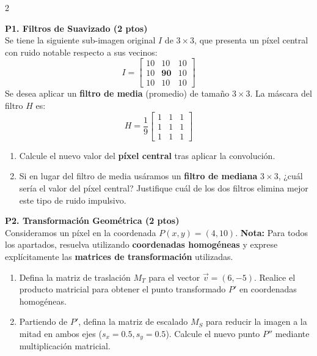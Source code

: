 \documentclass[a4paper,10pt]{extarticle}
\begin{document}
\begin{multicols*}{2}

\textbf{P1. Filtros de Suavizado (2 ptos)}\\
Se tiene la siguiente sub-imagen original $I$ de $3 \times 3$, que presenta un píxel central con ruido notable respecto a sus vecinos:
\[
I = 
\begin{bmatrix}
10 & 10 & 10 \\
10 & \mathbf{90} & 10 \\
10 & 10 & 10
\end{bmatrix}
\]
Se desea aplicar un \textbf{filtro de media} (promedio) de tamaño $3 \times 3$. La máscara del filtro $H$ es:
\[
H = \frac{1}{9}
\begin{bmatrix}
1 & 1 & 1 \\
1 & 1 & 1 \\
1 & 1 & 1
\end{bmatrix}
\]

\begin{enumerate}[label=\alph*)]
    \item Calcule el nuevo valor del \textbf{píxel central} tras aplicar la convolución.
    \item Si en lugar del filtro de media usáramos un \textbf{filtro de mediana} $3 \times 3$, ¿cuál sería el valor del píxel central? Justifique cuál de los dos filtros elimina mejor este tipo de ruido impulsivo.
\end{enumerate}

\vspace{1mm}


\textbf{P2. Transformación Geométrica (2 ptos)} \\
Consideramos un píxel en la coordenada $P(x, y) = (4, 10)$. 
\textbf{Nota:} Para todos los apartados, resuelva utilizando \textbf{coordenadas homogéneas} y exprese explícitamente las \textbf{matrices de transformación} utilizadas.

\begin{enumerate}
    \item[(a)] Defina la matriz de traslación $M_T$ para el vector $\vec{v} = (6, -5)$. Realice el producto matricial para obtener el punto transformado $P'$ en coordenadas homogéneas.
    
    \item[(b)] Partiendo de $P'$, defina la matriz de escalado $M_S$ para reducir la imagen a la mitad en ambos ejes ($s_x = 0.5, s_y = 0.5$). Calcule el nuevo punto $P''$ mediante multiplicación matricial.
    

\end{enumerate}
\end{multicols*}
\end{document}
